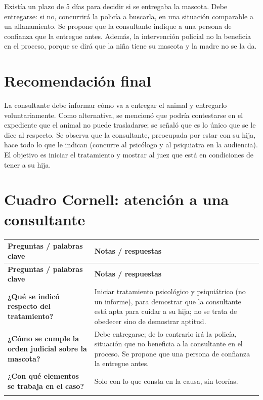 \documentclass[12pt,oneside]{book}
\makeatletter
\newenvironment{cornell}{%
  \par\smallskip
  \begin{longtable}{@{}>{\raggedright\arraybackslash}p{0.28\textwidth}
                    >{\raggedright\arraybackslash}p{0.66\textwidth}@{}}
  \toprule
  \textbf{Preguntas / palabras clave} & \textbf{Notas / respuestas} \\
  \midrule
  \endfirsthead
  \toprule
  \textbf{Preguntas / palabras clave} & \textbf{Notas / respuestas} \\
  \midrule
  \endhead
}{%
  \bottomrule
  \end{longtable}
}
\newcommand{\cornellresumen}[1]{%
  \midrule
  \multicolumn{2}{@{}p{0.96\textwidth}@{}}{\textbf{Resumen:} #1} \\
}
\makeatother
\begin{document}
Existía un plazo de 5 días para decidir si se entregaba la mascota. Debe entregarse: si no, concurrirá la policía a buscarla, en una situación comparable a un allanamiento. Se propone que la consultante indique a una persona de confianza que la entregue antes. Además, la intervención policial no la beneficia en el proceso, porque se dirá que la niña tiene su mascota y la madre no se la da.

\section{Recomendación final}

La consultante debe informar cómo va a entregar el animal y entregarlo voluntariamente. Como alternativa, se mencionó que podría contestarse en el expediente que el animal no puede trasladarse; se señaló que es lo único que se le dice al respecto. Se observa que la consultante, preocupada por estar con su hija, hace todo lo que le indican (concurre al psicólogo y al psiquiatra en la audiencia). El objetivo es iniciar el tratamiento y mostrar al juez que está en condiciones de tener a su hija.

\section{Cuadro Cornell: atención a una consultante}

\begin{cornell}
\textbf{¿Qué se indicó respecto del tratamiento?} &
Iniciar tratamiento psicológico y psiquiátrico (no un informe), para demostrar que la consultante está apta para cuidar a su hija; no se trata de obedecer sino de demostrar aptitud. \\[0.6em]

\textbf{¿Cómo se cumple la orden judicial sobre la mascota?} &
Debe entregarse; de lo contrario irá la policía, situación que no beneficia a la consultante en el proceso. Se propone que una persona de confianza la entregue antes. \\[0.6em]

\textbf{¿Con qué elementos se trabaja en el caso?} &
Solo con lo que consta en la causa, sin teorías. \\
\cornellresumen{La consultante debe iniciar tratamiento psicológico y psiquiátrico para demostrar su aptitud y cumplir voluntariamente la orden de entregar la mascota, trabajando con lo que consta en la causa.}
\end{cornell}
\end{document}
